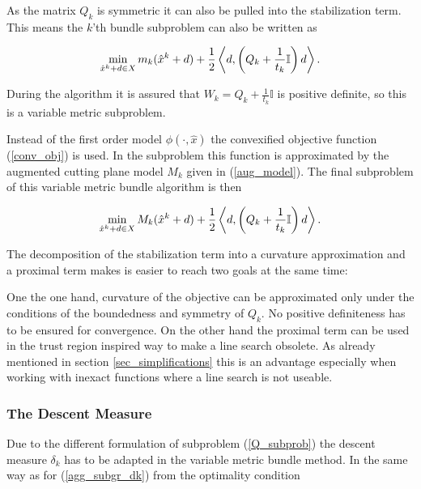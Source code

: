 As the matrix \(Q_k\) is symmetric it can also be pulled into the stabilization term. This means the \(k\)'th bundle subproblem can also be written as

\begin{equation}
	\min_{\hat{x}^k+d \in X} m_k(\hat{x}^k+d) + \frac{1}{2}\left\langle d,\left(Q_k+\frac{1}{t_k}\mathbb{I} \right) d \right\rangle.
\end{equation}

During the algorithm it is assured that \(W_k = Q_k+\frac{1}{t_k}\mathbb{I}\) is positive definite, so this is a variable metric subproblem.

Instead of the first order model \(\phi(\cdot,\hat{x})\) the convexified objective function (\ref{conv_obj}) is used. In the subproblem this function is approximated by the augmented cutting plane model \(M_k\) given in (\ref{aug_model}).
The final subproblem of this variable metric bundle algorithm is then

\begin{equation}
	\min_{\hat{x}^k+d \in X} M_k(\hat{x}^k+d) + \frac{1}{2}\left\langle d,\left(Q_k+\frac{1}{t_k}\mathbb{I} \right) d \right\rangle.
	\label{Q_subprob}
\end{equation}

The decomposition of the stabilization term into a curvature approximation and a proximal term makes is easier to reach two goals at the same time:

One the one hand, curvature of the objective can be approximated only under the conditions of the boundedness and symmetry of \(Q_k\). No positive definiteness has to be ensured for convergence.
On the other hand the proximal term can be used in the trust region inspired way to make a line search obsolete. As already mentioned in section \ref{sec_simplifications} this is an advantage especially when working with inexact functions where a line search is not useable.


\subsubsection{The Descent Measure}

Due to the different formulation of subproblem (\ref{Q_subprob}) the descent measure \(\delta_k\) has to be adapted in the variable metric bundle method.
In the same way as for (\ref{agg_subgr_dk}) from the optimality condition

